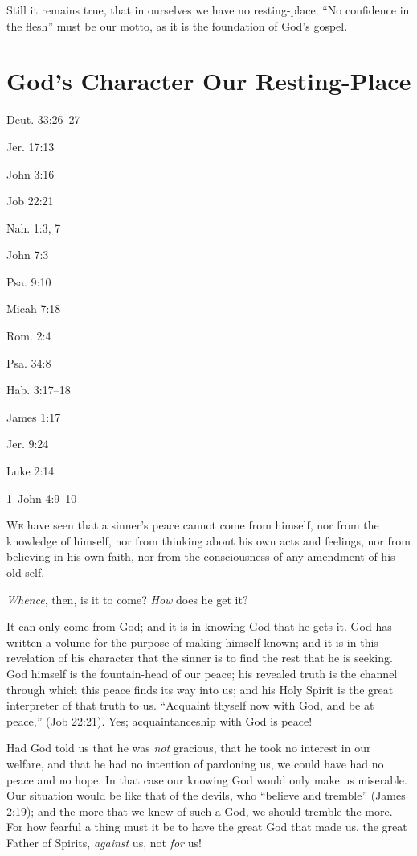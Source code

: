 \documentclass[
]{book}
\begin{document}
Still it remains true, that in ourselves we have no resting-place. ``No confidence in the flesh'' must be our motto, as it is the foundation of God's gospel.

\hypertarget{gods-character-our-resting-place}{%
\chapter{God's Character Our Resting-Place}\label{gods-character-our-resting-place}}

Deut. 33:26--27

Jer. 17:13

John 3:16

Job 22:21

Nah. 1:3, 7

John 7:3

Psa. 9:10

Micah 7:18

Rom. 2:4

Psa. 34:8

Hab. 3:17--18

James 1:17

Jer. 9:24

Luke 2:14

1~John 4:9--10

\textsc{We} have seen that a sinner's peace cannot come from himself, nor from the knowledge of himself, nor from thinking about his own acts and feelings, nor from believing in his own faith, nor from the consciousness of any amendment of his old self.

\emph{Whence}, then, is it to come? \emph{How} does he get it?

It can only come from God; and it is in knowing God that he gets it. God has written a volume for the purpose of making himself known; and it is in this revelation of his character that the sinner is to find the rest that he is seeking. God himself is the fountain-head of our peace; his revealed truth is the channel through which this peace finds its way into us; and his Holy Spirit is the great interpreter of that truth to us. ``Acquaint thyself now with God, and be at peace,'' (Job 22:21). Yes; acquaintanceship with God is peace!

Had God told us that he was \emph{not} gracious, that he took no interest in our welfare, and that he had no intention of pardoning us, we could have had no peace and no hope. In that case our knowing God would only make us miserable. Our situation would be like that of the devils, who ``believe and tremble'' (James 2:19); and the more that we knew of such a God, we should tremble the more. For how fearful a thing must it be to have the great God that made us, the great Father of Spirits, \emph{against} us, not \emph{for} us!
\end{document}
